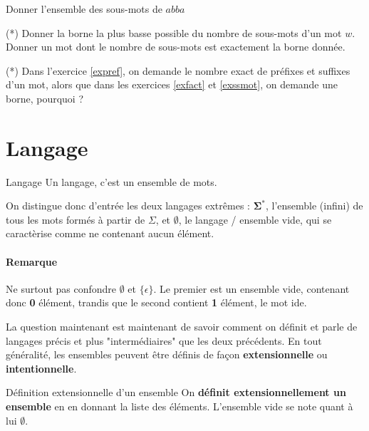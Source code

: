 \begin{exercice}
Donner l'ensemble des sous-mots de $abba$
\end{exercice}

\begin{exercice}\label{exssmot} (*)
Donner la borne la plus basse possible du nombre de sous-mots d'un mot $w$. Donner un mot dont le nombre de sous-mots est exactement la borne donnée.
\end{exercice}

\begin{exercice} (*) Dans l'exercice \ref{expref}, on demande le nombre exact de préfixes et suffixes d'un mot, alors que dans les exercices \ref{exfact} et \ref{exssmot}, on demande une borne, pourquoi ?
\end{exercice}

\section{Langage}

\begin{definition}{Langage}{}
Un langage, c'est un ensemble de mots. 
\end{definition}

On distingue donc d'entrée les deux langages extrêmes : $\mathbf{\Sigma^*}$, l'ensemble (infini) de tous les mots formés à partir de $\Sigma$, et $\mathbf{\emptyset}$, le langage / ensemble vide, qui se caractèrise comme ne contenant aucun élément.

\paragraph{Remarque} Ne surtout pas confondre $\emptyset$ et $\{\epsilon\}$. Le premier est un ensemble vide, contenant donc \textbf{0} élément, trandis que le second contient \textbf{1} élément, le mot ide. 

La question maintenant est maintenant de savoir comment on définit et parle de langages précis et plus "intermédiaires" que les deux précédents. En tout généralité, les ensembles peuvent être définis de façon \textbf{extensionnelle} ou \textbf{intentionnelle}. 

\begin{definition}{Définition extensionnelle d'un ensemble}{}
On \textbf{définit extensionnellement un ensemble} en en donnant la liste des éléments. L'ensemble vide se note quant à lui $\emptyset$.
\end{definition}

